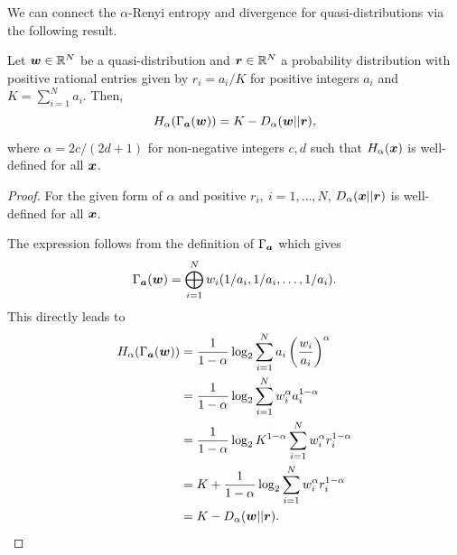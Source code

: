 \documentclass[pra,
aps,
twocolumn,
superscriptaddress,
groupedaddress,
nofootinbib,
reprint
]{revtex4-1}
\begin{document}
We can connect the $\alpha$-Renyi entropy and divergence for quasi-distributions via the following result.

\begin{theorem}\label{thm:H2D}
	Let $\boldsymbol{w}\in \mathbb{R}^N$ be a quasi-distribution and $\boldsymbol{r} \in \mathbb{R}^N$ a probability distribution with positive rational entries given by $r_i = a_i/K$ for positive integers $a_i$ and $K = \sum_{i=1}^N a_i$.
	Then,
	\begin{equation}
		H_\alpha(\Gamma_{\bm{a}}(\boldsymbol{w})) = K - D_\alpha(\boldsymbol{w} ||\boldsymbol{r}),
	\end{equation}
	where $\alpha = 2c / (2d+1)$ for non-negative integers $c,d$ such that $H_\alpha(\boldsymbol{x})$ is well-defined for all $\boldsymbol{x}$.
\end{theorem}
\begin{proof}
	For the given form of $\alpha$ and positive $r_i,\ i=1,\dots,N$, $D_\alpha(\boldsymbol{x} ||\boldsymbol{r})$ is well-defined for all $\boldsymbol{x}$.

	The expression follows from the definition of $\Gamma_{\bm{a}}$ which gives
	\begin{equation}
		\Gamma_{\bm{a}}(\boldsymbol{w}) = \bigoplus_{i=1}^N w_i (1/a_i, 1/a_i, \dots, 1/a_i).
	\end{equation}
	This directly leads to
	\begin{align}
		H_\alpha(\Gamma_{\bm{a}}(\boldsymbol{w})) &= \frac{1}{1-\alpha} \log_2 \sum_{i=1}^N a_i \left( \frac{w_i}{a_i} \right)^\alpha \nonumber\\
		&= \frac{1}{1-\alpha} \log_2 \sum_{i=1}^N w_i^{\alpha} a_i^{1-\alpha} \nonumber\\
		&= \frac{1}{1-\alpha} \log_2 K^{1-\alpha} \sum_{i=1}^N w_i^{\alpha} r_i^{1-\alpha} \nonumber\\
		&= K + \frac{1}{1-\alpha} \log_2 \sum_{i=1}^N w_i^{\alpha} r_i^{1-\alpha} \nonumber\\
		&= K - D_\alpha(\boldsymbol{w} ||\boldsymbol{r}).
	\end{align}
\end{proof}
\end{document}
